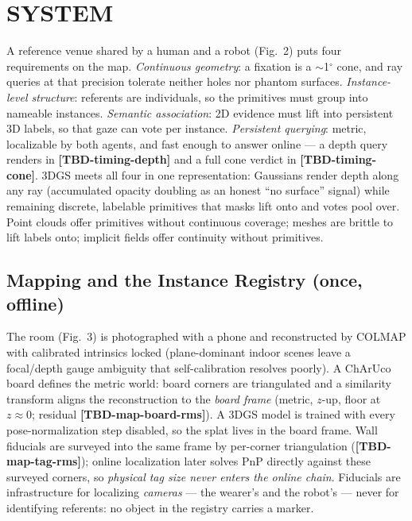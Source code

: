 \documentclass[letterpaper, 10 pt, conference]{ieeeconf}  %
\newcommand{\TBD}[1]{\textbf{\color{red}[TBD-#1]}}
\begin{document}
\section{SYSTEM}

A reference venue shared by a human and a robot (Fig.~2) puts four
requirements on the map. \emph{Continuous geometry}: a fixation is a
$\sim$1$^\circ$ cone, and ray queries at that precision tolerate
neither holes nor phantom surfaces. \emph{Instance-level structure}:
referents are individuals, so the primitives must group into nameable
instances. \emph{Semantic association}: 2D evidence must lift into
persistent 3D labels, so that gaze can vote per instance.
\emph{Persistent querying}: metric, localizable by both agents, and
fast enough to answer online --- a depth query renders in
\TBD{timing-depth} and a full cone verdict in \TBD{timing-cone}.
3DGS meets all four in one representation: Gaussians render depth
along any ray (accumulated opacity doubling as an honest ``no
surface'' signal) while remaining discrete, labelable primitives that
masks lift onto and votes pool over. Point clouds offer primitives
without continuous coverage; meshes are brittle to lift labels onto;
implicit fields offer continuity without primitives.

\subsection{Mapping and the Instance Registry (once, offline)}
The room (Fig.~3) is photographed with a phone and reconstructed by
COLMAP with calibrated intrinsics locked (plane-dominant indoor
scenes leave a focal/depth gauge ambiguity that self-calibration
resolves poorly). A ChArUco board defines the metric world: board
corners are triangulated and a similarity transform aligns the
reconstruction to the \emph{board frame} (metric, $z$-up, floor at
$z\!\approx\!0$; residual \TBD{map-board-rms}).
A 3DGS model is trained with every pose-normalization step disabled,
so the splat lives in the board frame. Wall fiducials are surveyed
into the same frame by per-corner triangulation
(\TBD{map-tag-rms}); online localization later solves PnP
directly against these surveyed corners, so \emph{physical tag size
never enters the online chain}. Fiducials are infrastructure for
localizing \emph{cameras} --- the wearer's and the robot's --- never
for identifying referents: no object in the registry carries a
marker.
\end{document}
